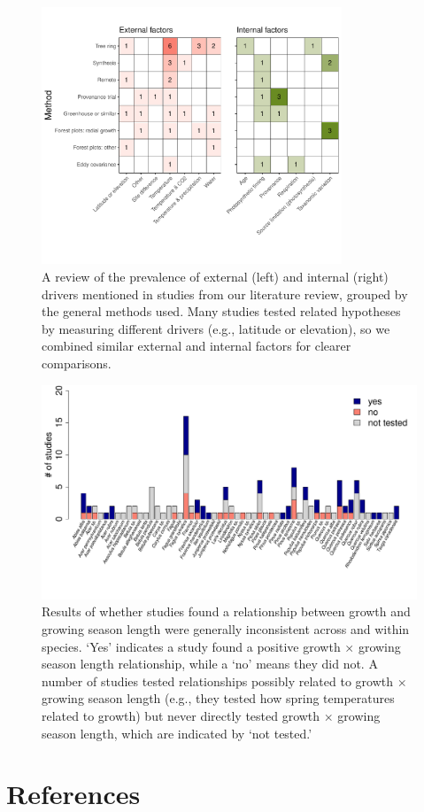 \documentclass[11pt]{article}
\begin{document}
\begin{figure}[h!]
\includegraphics[width=0.8\textwidth]{..//figures/heatmaps/heatmap_combined_endo&exo.pdf}
\caption{A review of the prevalence of external (left) and internal (right) drivers mentioned in studies from our literature review, grouped by the general methods used. Many studies tested related hypotheses by measuring different drivers (e.g., latitude or elevation), so we combined similar external and internal factors for clearer comparisons.}
\label{fig:heatmapssupp}
\end{figure}

\clearpage
\begin{figure}[h!]
\includegraphics[width=1\textwidth]{..//figures/speciesnums_finds.pdf}
\caption{Results of whether studies found a relationship between growth and growing season length were generally inconsistent across  and within species. `Yes' indicates a study found a positive growth $\times$ growing season length relationship, while a `no' means they did not. A number of studies tested relationships possibly related to growth $\times$ growing season length (e.g., they tested how spring temperatures related to growth) but never directly tested growth $\times$ growing season length, which are indicated by `not tested.'}
\label{fig:sppfinds}
\end{figure}


\clearpage
\section*{References}


\end{document}
